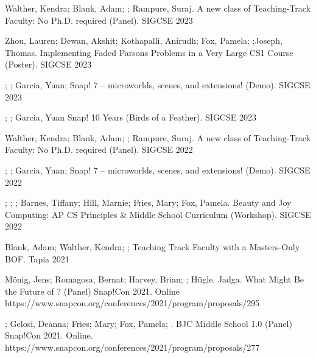 \begin{etaremune}
    \setlength\itemsep{1em}
    \item{Walther, Kendra; Blank, Adam; \me; Rampure, Suraj.	A new class of Teaching-Track Faculty: No Ph.D. required (Panel). SIGCSE 2023}
    
    \item{Zhou, Lauren; Dewan, Akshit; Kothapalli, Anirudh; Fox, Pamela; \me ;Joseph, Thomas. \newline Implementing Faded Parsons Problems in a Very Large CS1 Course (Poster). SIGCSE 2023}
    
    \item{\dan; \me; Garcia, Yuan; Snap! 7 – microworlds, scenes, and extensions! (Demo). SIGCSE 2023}
    
    \item{\me; \dan; Garcia, Yuan Snap! 10 Years (Birds of a Feather). SIGCSE 2023}
    
    \item{Walther, Kendra; Blank, Adam; \me; Rampure, Suraj.	A new class of Teaching-Track Faculty: No Ph.D. required (Panel). SIGCSE 2022}
    
    \item{\dan; \me; Garcia, Yuan; Snap! 7 – microworlds, scenes, and extensions! (Demo). SIGCSE 2022}
    
    \item{\me; \lauren; \dan; Barnes, Tiffany; Hill, Marnie; Fries, Mary; Fox, Pamela. Beauty and Joy Computing: AP CS Principles \& Middle School Curriculum (Workshop). SIGCSE 2022}
    
    \item{Blank, Adam; Walther, Kendra; \me; Teaching Track Faculty with a Masters-Only BOF.
    Tapia 2021
    }
    
    \item{Mönig, Jens; Romagosa, Bernat; Harvey, Brian; \me; Hügle, Jadga. What Might Be the Future of \snap? (Panel) Snap!Con 2021. Online
    \newline
    https://www.snapcon.org/conferences/2021/program/proposals/295}
    
    \item{\dan; Gelosi, Deanna; Fries; Mary; Fox, Pamela; \me. BJC Middle School 1.0 (Panel)
    Snap!Con 2021. Online.
    \newline
    https://www.snapcon.org/conferences/2021/program/proposals/277}


\end{etaremune}
